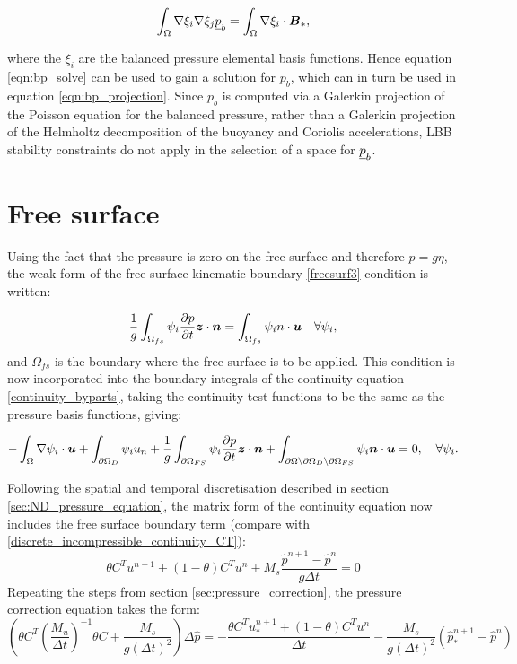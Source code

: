 \begin{equation}\label{eqn:bp_solve}
  \int_\Omega \nabla \xi_i \nabla \xi_j \underline{p}_b = \int_\Omega \nabla \xi_i \cdot {\mbox{\boldmath$B$}}_*,
\end{equation}

where the $\xi_i$ are the balanced pressure elemental basis functions. Hence equation
\eqref{eqn:bp_solve} can be used to gain a solution for $p_b$, which can in turn
be used in equation \eqref{eqn:bp_projection}. Since $p_b$ is computed via
a Galerkin projection of the Poisson equation for the balanced pressure,
rather than a Galerkin projection of the Helmholtz decomposition of the buoyancy
and Coriolis accelerations, LBB stability constraints do not apply in the selection
of a space for $\underline{p}_b$.

\section{Free surface}\label{sec:free_surface}

Using the fact that the pressure is zero on the free surface and therefore $p=g\eta$, the weak form of the free surface kinematic boundary \eqref{freesurf3} condition is written:

\begin{equation}\label{weakfreesurf3}
\frac{1}{g} \int_{\Omega_{fs}} {\psi_i }\frac{\partial p}{\partial t}{\mbox{\boldmath$z$}} \cdot {\mbox{\boldmath$n$}}=\int_{\Omega_{fs}} \psi_i {n \cdot {\mbox{\boldmath$u$}}} \quad
  \forall \psi_i,
\end{equation}
and $\Omega_{fs}$ is the boundary where the free surface is to be applied. This condition is now incorporated into the boundary integrals of the continuity equation \eqref{continuity_byparts}, taking the continuity test functions to be the same as the pressure basis functions, giving:

\begin{equation}\label{continuity_byparts_withfs}
  -\int_\Omega \nabla\psi_i \cdot {\mbox{\boldmath$u$}}
  + \int_{\partial\Omega_D} \psi_i u_n
  + \frac{1}{g} \int_{\partial\Omega_{FS}}  {\psi_i }\frac{\partial p}{\partial t}{\mbox{\boldmath$z$}} \cdot {\mbox{\boldmath$n$}}
  + \int_{\partial\Omega\setminus\partial\Omega_D\setminus\partial\Omega_{FS}} \psi_i{\mbox{\boldmath$n$}}\cdot {\mbox{\boldmath$u$}}
  = 0,\quad
  \forall \psi_i.
\end{equation}

Following the spatial and temporal discretisation described in section \ref{sec:ND_pressure_equation}, 
the matrix form of the continuity equation now includes the free surface boundary term (compare with 
\eqref{discrete_incompressible_continuity_CT}):
\begin{equation}
\theta C^T u^{n+1} + (1-\theta) C^T u^n + M_s \frac{\hat p^{n+1}-\hat p^n}{g \Delta t}=0
\end{equation}
Repeating the steps from section \ref{sec:pressure_correction}, the pressure correction equation takes the form:
\begin{equation}
\left(\theta C^T(\frac{M_u}{\Delta t})^{-1} \theta C + \frac{M_s}{g(\Delta t)^2}\right)\Delta \hat p = -\frac{\theta C^T u_*^{n+1} + (1-\theta)C^Tu^n}{\Delta t}-\frac{M_s}{g(\Delta t)^2}(\hat p_*^{n+1}-\hat p^n)
\end{equation}


